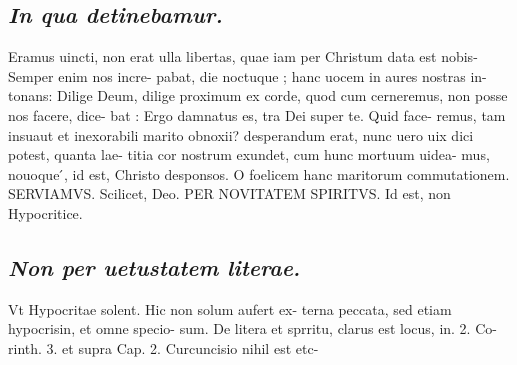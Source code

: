 \documentclass{article}
\begin{document}
\begin{pages}
\subsection*{\textit{In qua detinebamur. }}\pstart Eramus uincti, non erat ulla libertas, quae iam per Christum data est nobis-Semper enim nos incre- pabat, die noctuque ; hanc uocem in aures nostras in- tonans: Dilige Deum, dilige proximum ex corde, quod cum cerneremus, non posse nos facere, dice- bat : Ergo damnatus es, tra Dei super te. Quid face- remus, tam insuaut et inexorabili marito obnoxii? desperandum erat, nunc uero uix dici potest, quanta lae- titia cor nostrum exundet, cum hunc mortuum uidea- mus, nouoque ́, id est, Christo desponsos. O foelicem hanc maritorum commutationem. SERVIAMVS.   \pend\pstart Scilicet, Deo. PER NOVITATEM SPIRITVS. Id est, non Hypocritice.   \pend
{}
{}
\subsection*{\textit{Non per uetustatem literae. }}\pstart Vt Hypocritae solent. Hic non solum aufert ex- terna peccata, sed etiam hypocrisin, et omne specio- sum. De litera et sprritu, clarus est locus, in. 2. Co- rinth. 3. et supra Cap. 2. Curcuncisio nihil est etc-  \pend

\end{pages}
\end{document}
